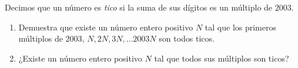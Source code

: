 Decimos que un número es {\itshape tico} si la suma de sus dígitos es un múltiplo de $2003$.
\begin{enumerate}
    \item  Demuestra que existe un número entero positivo $N$ tal que los primeros múltiplos de $2003$, $N,2N,3N,\ldots 2003N$ son todos ticos.
    \item  ¿Existe un número entero positivo $N$ tal que todos sus múltiplos son ticos?
\end{enumerate}
